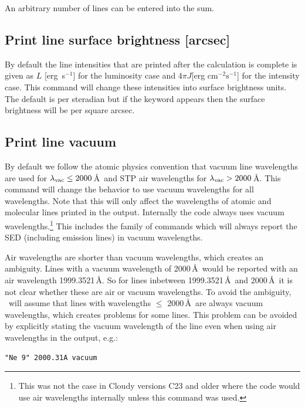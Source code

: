 An arbitrary number of lines can be entered into the sum.

\subsection{Print line surface brightness [arcsec]}
\label{sec:CommandPrintLineSurfaceBrightness}

By default the line intensities that are printed after the calculation
is complete is given as $L$ [erg~s$^{-1}$] for the luminosity case and
$4\pi J$[erg cm$^{-2} \mathrm{s}^{-1}$] for the intensity case.
This command will change these
intensities into surface brightness units.
The default is per steradian
but if the keyword  appears then the surface brightness will be per square arcsec.

\subsection{Print line vacuum}
\label{sec:CommandPrintVacuum}
By default we follow the atomic physics convention that vacuum line wavelengths are used
for $\lambda_{\rm vac} \le 2000$\,\AA\ and STP air wavelengths for $\lambda_{\rm vac} > 2000$\,\AA.
This command will change the behavior to use vacuum wavelengths for all wavelengths.
Note that this will only affect the wavelengths of atomic and molecular lines
printed in the output. Internally the code always uses vacuum wavelengths.\footnote{This
  was not the case in Cloudy versions C23 and older where the code would use air wavelengths
  internally unless this command was used.}
This includes the  family of commands which will
always report the SED (including emission lines) in vacuum wavelengths.

Air wavelengths are shorter than vacuum wavelengths, which creates an ambiguity. Lines with
a vacuum wavelength of 2000\,\AA\ would be reported with an air wavelength 1999.3521\,\AA. So
for lines inbetween 1999.3521\,\AA\ and 2000\,\AA\ it is not clear whether these are air or
vacuum wavelengths. To avoid the ambiguity, \Cloudy\ will assume that lines with wavelengths
$\le$ 2000\,\AA\ are always vacuum wavelengths, which creates problems for some lines. This
problem can be avoided by explicitly stating the vacuum wavelength of the line even when
using air wavelengths in the output, e.g.:
\begin{verbatim}
"Ne 9" 2000.31A vacuum
\end{verbatim}

